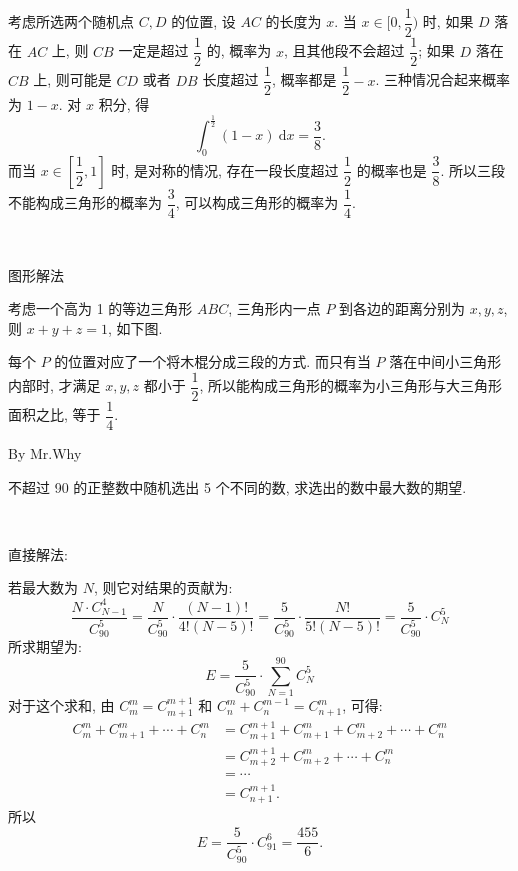 考虑所选两个随机点 $C,D$ 的位置, 设 $AC$ 的长度为 $x$. 当 $x\in[0,\dfrac{1}{2})$ 时, 如果 $D$ 落在 $AC$ 上, 则 $CB$ 一定是超过 $\dfrac{1}{2}$ 的, 概率为 $x$, 且其他段不会超过 $\dfrac{1}{2}$; 如果 $D$ 落在 $CB$ 上, 则可能是 $CD$ 或者 $DB$ 长度超过 $\dfrac{1}{2}$, 概率都是 $\dfrac{1}{2} - x$. 三种情况合起来概率为 $1 - x$. 对 $x$ 积分, 得
\[\int_0^{\frac{1}{2}}{(1-x)}\ \mathrm{d}x = \frac{3}{8}.\]
而当 $x\in[\dfrac{1}{2},1]$ 时, 是对称的情况, 存在一段长度超过 $\dfrac{1}{2}$ 的概率也是 $\dfrac{3}{8}$. 所以三段不能构成三角形的概率为 $\dfrac{3}{4}$, 可以构成三角形的概率为 $\dfrac{1}{4}$.

~

\noindent 图形解法

考虑一个高为 1 的等边三角形 $ABC$, 三角形内一点 $P$ 到各边的距离分别为 $x,y,z$, 则 $x + y + z = 1$, 如下图.
\begin{figure*}[htbp]
\centering
{}
\end{figure*}

每个 $P$ 的位置对应了一个将木棍分成三段的方式. 而只有当 $P$ 落在中间小三角形内部时, 才满足 $x,y,z$ 都小于 $\dfrac{1}{2}$, 所以能构成三角形的概率为小三角形与大三角形面积之比, 等于 $\dfrac{1}{4}$.

\newpage
\noindent By Mr.Why

不超过 90 的正整数中随机选出 5 个不同的数, 求选出的数中最大数的期望.

~

\noindent 直接解法:

若最大数为 $N$, 则它对结果的贡献为:
\[\frac{N\cdot C_{N-1}^4}{C_{90}^5}=\frac{N}{C_{90}^5}\cdot\frac{(N-1)!}{4!(N-5)!}=\frac{5}{C_{90}^5}\cdot\frac{N!}{5!(N-5)!}=\frac{5}{C_{90}^5}\cdot C_{N}^{5}\]
所求期望为:
\[E = \frac{5}{C_{90}^5}\cdot\sum_{N=1}^{90}{C_N^5}\]
对于这个求和, 由 $C_m^m=C_{m+1}^{m+1}$ 和 $C_n^m + C_n^{m-1}=C_{n+1}^m$, 可得:
\begin{align*}
C_m^m + C_{m+1}^m+\cdots+C_n^m &= C_{m+1}^{m+1}+ C_{m+1}^m + C_{m+2}^m + \cdots + C_n^m \\
&= C_{m+2}^{m+1} + C_{m+2}^m + \cdots + C_n^m \\
&= \cdots \\
&= C_{n+1}^{m+1}.
\end{align*}
所以 
\[E=\frac{5}{C_{90}^5}\cdot C_{91}^6 = \frac{455}{6}.\]

